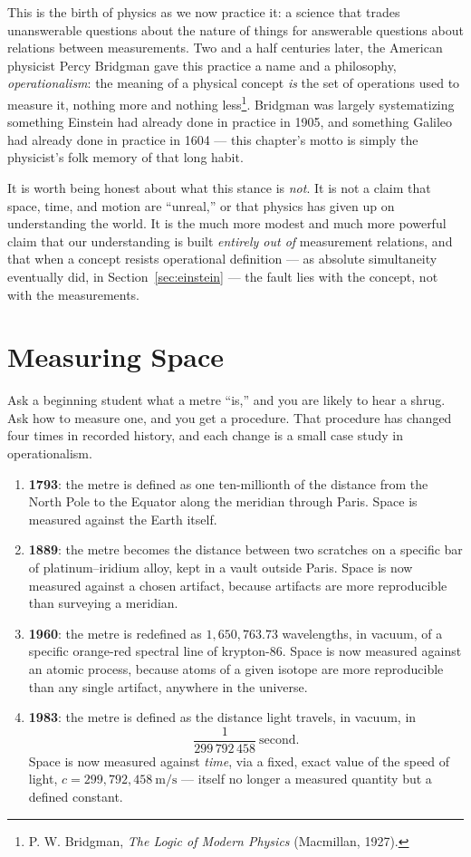 \documentclass[12pt]{book}
\begin{document}
This is the birth of physics as we now practice it: a science that trades unanswerable questions about the nature of things for answerable questions about relations between measurements. Two and a half centuries later, the American physicist Percy Bridgman gave this practice a name and a philosophy, \emph{operationalism}: the meaning of a physical concept \emph{is} the set of operations used to measure it, nothing more and nothing less\footnote{P. W. Bridgman, \emph{The Logic of Modern Physics} (Macmillan, 1927).}. Bridgman was largely systematizing something Einstein had already done in practice in 1905, and something Galileo had already done in practice in 1604 --- this chapter's motto is simply the physicist's folk memory of that long habit.

It is worth being honest about what this stance is \emph{not}. It is not a claim that space, time, and motion are ``unreal,'' or that physics has given up on understanding the world. It is the much more modest and much more powerful claim that our understanding is built \emph{entirely out of} measurement relations, and that when a concept resists operational definition --- as absolute simultaneity eventually did, in Section~\ref{sec:einstein} --- the fault lies with the concept, not with the measurements.

\section{Measuring Space}
\label{sec:space}

Ask a beginning student what a metre ``is,'' and you are likely to hear a shrug. Ask how to measure one, and you get a procedure. That procedure has changed four times in recorded history, and each change is a small case study in operationalism.

\begin{enumerate}[label=(\roman*)]
  \item \textbf{1793}: the metre is defined as one ten-millionth of the distance from the North Pole to the Equator along the meridian through Paris. Space is measured against the Earth itself.
  \item \textbf{1889}: the metre becomes the distance between two scratches on a specific bar of platinum--iridium alloy, kept in a vault outside Paris. Space is now measured against a chosen artifact, because artifacts are more reproducible than surveying a meridian.
  \item \textbf{1960}: the metre is redefined as \(1{,}650{,}763.73\) wavelengths, in vacuum, of a specific orange-red spectral line of krypton-86. Space is now measured against an atomic process, because atoms of a given isotope are more reproducible than any single artifact, anywhere in the universe.
  \item \textbf{1983}: the metre is defined as the distance light travels, in vacuum, in
  \[
    \frac{1}{299\,792\,458}\ \text{second}.
  \]
  Space is now measured against \emph{time}, via a fixed, exact value of the speed of light, \(c = 299{,}792{,}458\ \text{m/s}\) --- itself no longer a measured quantity but a defined constant.
\end{enumerate}
\end{document}

